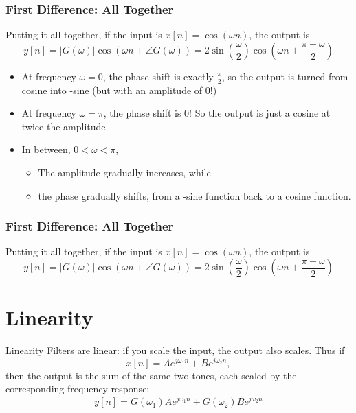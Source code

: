 \documentclass{beamer}
\begin{document}
\begin{frame}
  \frametitle{First Difference: All Together}
  Putting it all together, if the input is $x[n]=\cos(\omega n)$, the output is
  \[
  y[n]=|G(\omega)|\cos\left(\omega n+\angle G(\omega)\right)
  =2\sin\left(\frac{\omega}{2}\right)\cos\left(\omega n+\frac{\pi-\omega}{2}\right)
  \]
  \begin{itemize}
  \item At frequency $\omega=0$, the phase shift is exactly $\frac{\pi}{2}$,
    so the output is turned from cosine into -sine (but with an amplitude of 0!)
  \item At frequency $\omega=\pi$, the phase shift is 0!  So the output
    is just a cosine at twice the amplitude.
  \item In between, $0<\omega <\pi$,
    \begin{itemize}
    \item The amplitude gradually increases, while
    \item the phase gradually shifts, from a -sine function back to a cosine function.
    \end{itemize}
  \end{itemize}
\end{frame}

\begin{frame}
  \frametitle{First Difference: All Together}
  Putting it all together, if the input is $x[n]=\cos(\omega n)$, the output is
  \[
  y[n]=|G(\omega)|\cos\left(\omega n+\angle G(\omega)\right)
  =2\sin\left(\frac{\omega}{2}\right)\cos\left(\omega n+\frac{\pi-\omega}{2}\right)
  \]
  \centerline{}
\end{frame}

\section[Linearity]{Linearity}
\setcounter{subsection}{1}

\begin{frame}
  \begin{block}{Linearity}
    Filters are linear: if you scale the input, the output also scales.  Thus if
    \[
    x[n] = Ae^{j\omega_1 n} + Be^{j\omega_2 n},
    \]
    then the output is the sum of the same two tones, each scaled by
    the corresponding frequency response:
    \[
    y[n] = G(\omega_1)Ae^{j\omega_1 n}+G(\omega_2)Be^{j\omega_2 n}
    \]
  \end{block}
\end{frame}
\end{document}
